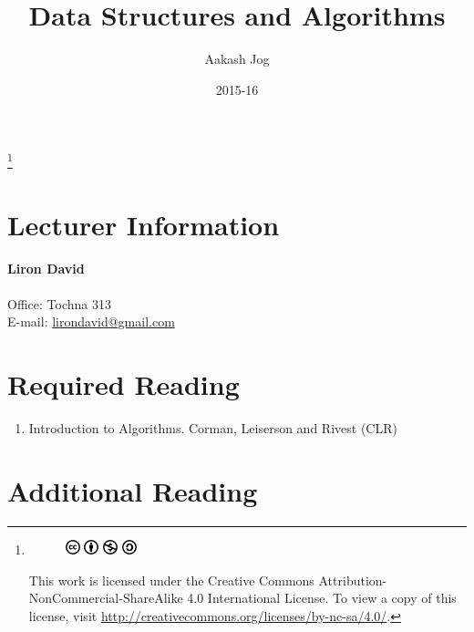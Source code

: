 \documentclass[titlepage, fleqn, a4paper, 12pt, twoside]{article}
\title{Data Structures and Algorithms}
\author{Aakash Jog}
\date{2015-16}
\theoremstyle{definition}
\theoremstyle{theorem}
\newcommand\blfootnote[1]{%
	\begingroup
	\renewcommand\thefootnote{}\footnote{#1}%
	\addtocounter{footnote}{-1}%
	\endgroup
}
\begin{document}
\begin{titlepage}
\maketitle
\end{titlepage}
\restoregeometry

\blfootnote
{	
	\begin{figure}[H]
		\includegraphics[height = 12pt]{cc.pdf}
		\includegraphics[height = 12pt]{by.pdf}
		\includegraphics[height = 12pt]{nc.pdf}
		\includegraphics[height = 12pt]{sa.pdf}
	\end{figure}
	\noindent
	This work is licensed under the Creative Commons Attribution-NonCommercial-ShareAlike 4.0 International License. To view a copy of this license, visit \url{http://creativecommons.org/licenses/by-nc-sa/4.0/}.
} %

\tableofcontents

\clearpage
\section{Lecturer Information}

\textbf{Liron David}\\
~\\
Office: Tochna 313\\
E-mail: \href{mailto:lirondavid@gmail.com}{lirondavid@gmail.com}\\

\section{Required Reading}

\begin{enumerate}
	\item Introduction to Algorithms. Corman, Leiserson and Rivest (CLR)
\end{enumerate}

\section{Additional Reading}
\end{document}
